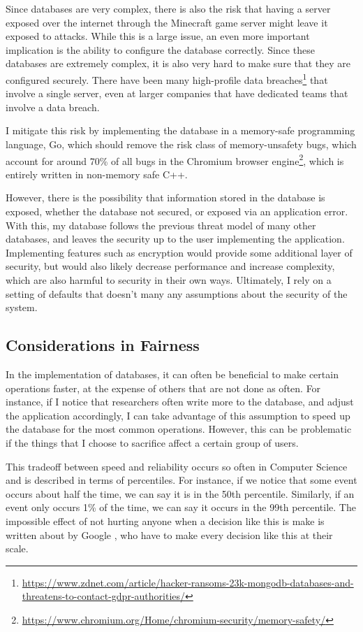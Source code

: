 \documentclass[10pt,twocolumn]{article}
\begin{document}
Since databases are very complex, there is also the risk that having a
server exposed over the internet through the Minecraft game server might leave
it exposed to attacks. While this is a large issue, an even more important
implication is the ability to configure the database correctly. Since these
databases are extremely complex, it is also very hard to make sure that they are
configured securely. There have been many high-profile data
breaches\footnote{\url{https://www.zdnet.com/article/hacker-ransoms-23k-mongodb-databases-and-threatens-to-contact-gdpr-authorities/}}
that involve a single server, even at larger companies that have dedicated teams
that involve a data breach.

I mitigate this risk by implementing the database in a memory-safe
programming language, Go, which should remove the risk class of memory-unsafety
bugs, which account for around 70\% of all bugs in the Chromium browser
engine\footnote{\url{https://www.chromium.org/Home/chromium-security/memory-safety/}},
which is entirely written in non-memory safe C++.

However, there is the possibility that information stored in the database is
exposed, whether the database not secured, or exposed via an application error.
With this, my database follows the previous threat model of many other
databases, and leaves the security up to the user implementing the application.
Implementing features such as encryption would provide some additional layer of
security, but would also likely decrease performance and increase complexity,
which are also harmful to security in their own ways. Ultimately, I rely on a
setting of defaults that doesn't many any assumptions about the security of the
system.

\subsection{Considerations in Fairness}

In the implementation of databases, it can often be beneficial to make certain
operations faster, at the expense of others that are not done as often. For
instance, if I notice that researchers often write more to the database, and
adjust the application accordingly, I can take advantage of this assumption to
speed up the database for the most common operations. However, this can be
problematic if the things that I choose to sacrifice affect a certain group of
users.

This tradeoff between speed and reliability occurs so often in Computer Science 
and is described in terms of percentiles. For instance, if we notice that some
event occurs about half the time, we can say it is in the 50th percentile.
Similarly, if an event only occurs 1\% of the time, we can say it occurs in the
99th percentile. The impossible effect of not hurting anyone when a decision
like this is make is written about by Google \cite{dean2013tail}, who have to make every
decision like this at their scale.
\end{document}
